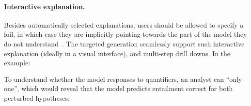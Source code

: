 \paragraph{Interactive explanation.}
Besides automatically selected explanations, users should be allowed to specify a foil, in which case they are implicitly pointing towards the part of the model they do not understand~\cite{miller}.
The targeted generation seamlessly support such interactive explanation (ideally in a visual interface), and multi-step drill downs.
In the example: 


To understand whether the model responses to quantifiers, an analyst can \BLANK ``only one'', which would reveal that the model predicts entailment correct for both perturbed hypotheses:


